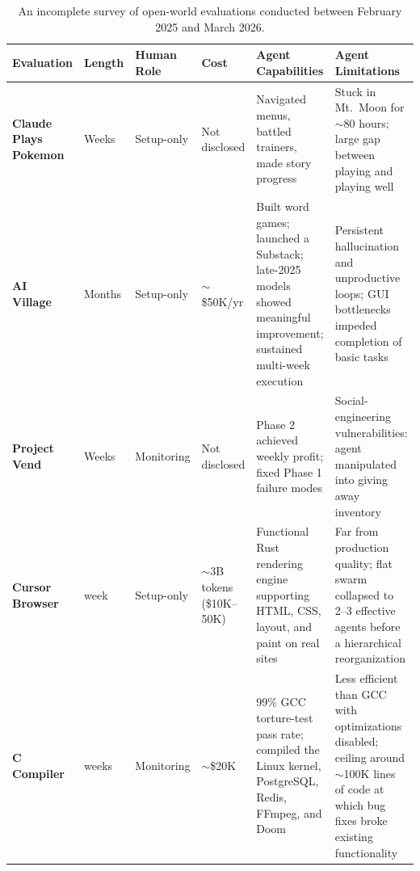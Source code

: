\documentclass{article}
\begin{document}
\begin{table}[t]
\centering
\caption{An incomplete survey of open-world evaluations conducted between February 2025 and March 2026.}
\label{tab:open-world-survey}
\footnotesize
\setlength{\tabcolsep}{5pt}
\begin{tabular}{@{}>{\raggedright\arraybackslash}p{2.1cm}>{\raggedright\arraybackslash}p{1.1cm}>{\raggedright\arraybackslash}p{1.5cm}>{\raggedright\arraybackslash}p{1.4cm}>{\raggedright\arraybackslash}p{3.2cm}>{\raggedright\arraybackslash}p{3.2cm}@{}}
\toprule
\textbf{Evaluation} & \textbf{Length} & \textbf{Human Role} & \textbf{Cost} & \textbf{\textcolor{capgreen}{Agent Capabilities}} & \textbf{\textcolor{limred}{Agent Limitations}} \\
\midrule
\textbf{Claude Plays Pokemon}~\citep{futurismComAdvancedAi}
& Weeks & Setup-only & Not disclosed
& \textcolor{capgreen}{Navigated menus, battled trainers, made story progress}
& \textcolor{limred}{Stuck in Mt.~Moon for $\sim$80 hours; large gap between playing and playing well} \\
\addlinespace[4pt]
\textbf{AI Village}~\citep{theaidigestOrgVillage}
& Months & Setup-only & $\sim$\$50K/yr
& \textcolor{capgreen}{Built word games; launched a Substack; late-2025 models showed meaningful improvement; sustained multi-week execution}
& \textcolor{limred}{Persistent hallucination and unproductive loops; GUI bottlenecks impeded completion of basic tasks} \\
\addlinespace[4pt]
\textbf{Project Vend}~\citep{anthropicComResearchProject,anthropicComResearchProject2}
& Weeks & Monitoring & Not disclosed
& \textcolor{capgreen}{Phase 2 achieved weekly profit; fixed Phase 1 failure modes}
& \textcolor{limred}{Social-engineering vulnerabilities: agent manipulated into giving away inventory} \\
\addlinespace[4pt]
\textbf{Cursor Browser}~\citep{cursorComBlogScaling}
& 1 week & Setup-only & $\sim$3B tokens (\$10K--50K)
& \textcolor{capgreen}{Functional Rust rendering engine supporting HTML, CSS, layout, and paint on real sites}
& \textcolor{limred}{Far from production quality; flat swarm collapsed to 2--3 effective agents before a hierarchical reorganization} \\
\addlinespace[4pt]
\textbf{C Compiler}~\citep{anthropicComEngineeringBuilding}
& 2 weeks & Monitoring & $\sim$\$20K
& \textcolor{capgreen}{99\% GCC torture-test pass rate; compiled the Linux kernel, PostgreSQL, Redis, FFmpeg, and Doom}
& \textcolor{limred}{Less efficient than GCC with optimizations disabled; ceiling around $\sim$100K lines of code at which bug fixes broke existing functionality} \\

\end{tabular}
\end{table}
\end{document}

